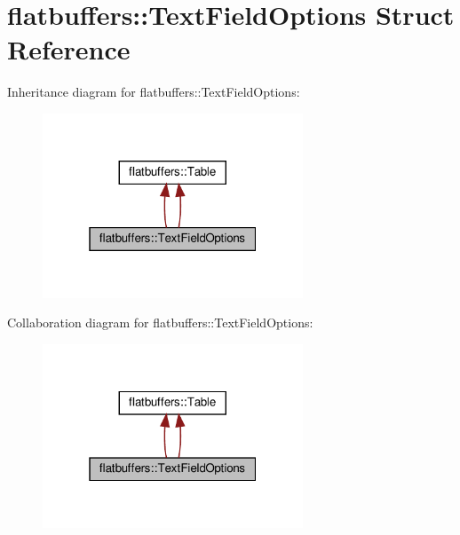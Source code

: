 \hypertarget{structflatbuffers_1_1TextFieldOptions}{}\section{flatbuffers\+:\+:Text\+Field\+Options Struct Reference}
\label{structflatbuffers_1_1TextFieldOptions}


Inheritance diagram for flatbuffers\+:\+:Text\+Field\+Options\+:
\nopagebreak
\begin{figure}[H]
\begin{center}
\leavevmode
\includegraphics[width=220pt]{structflatbuffers_1_1TextFieldOptions__inherit__graph}
\end{center}
\end{figure}


Collaboration diagram for flatbuffers\+:\+:Text\+Field\+Options\+:
\nopagebreak
\begin{figure}[H]
\begin{center}
\leavevmode
\includegraphics[width=220pt]{structflatbuffers_1_1TextFieldOptions__coll__graph}
\end{center}
\end{figure}
